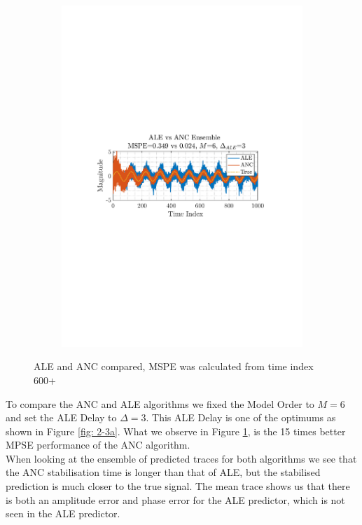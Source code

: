 \documentclass[12pt]{article}
\begin{document}
\begin{figure}[H]
\begin{subfigure}{0.49\textwidth}
					\includegraphics[trim={2.2cm 11.2cm 3.00cm  11.2cm}, clip, width=\textwidth]{../MATLAB/figures/q2_3c_fig02.pdf} 
					\captionsetup{justification=centering}
				\end{subfigure}
				\captionsetup{justification=centering}
				\caption{ALE and ANC compared, MSPE was calculated from time index 600+}
				\label{fig: 2-3c}
			\end{figure}
		
			To compare the ANC and ALE algorithms we fixed the Model Order to $M=6$ and set the ALE Delay to $\Delta=3$. This ALE Delay is one of the optimums as shown in Figure \ref{fig: 2-3a}. What we observe in Figure \ref{fig: 2-3c}, is the 15 times better MPSE performance of the ANC algorithm.\\
			When looking at the ensemble of predicted traces for both algorithms we see that the ANC stabilisation time is longer than that of ALE, but the stabilised prediction is much closer to the true signal. The mean trace shows us that there is both an amplitude error and phase error for the ALE predictor, which is not seen in the ALE predictor.
		
\end{document}

